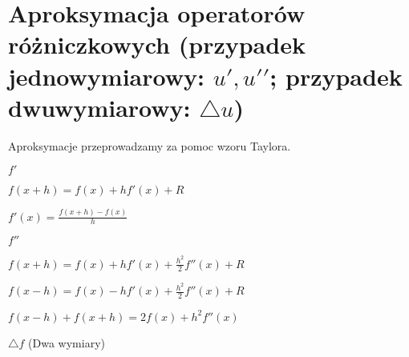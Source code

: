 \section{Aproksymacja operatorów różniczkowych (przypadek jednowymiarowy: ${u}', {{u}'}'$; przypadek dwuwymiarowy: $\bigtriangleup u$)}

Aproksymacje przeprowadzamy za pomoc wzoru Taylora. 

$f'$

$f(x+h) = f(x) + hf'(x) + R$

$f'(x) = \frac{f(x + h) - f(x)}{h}$

$f''$

$f(x+h) = f(x) + hf'(x) + \frac{h^2}{2}f''(x) + R$

$f(x-h) = f(x) - hf'(x) + \frac{h^2}{2}f''(x) + R$

$f(x-h) + f(x+h) = 2f(x) + h^2 f''(x)$


$\bigtriangleup f$ (Dwa wymiary)